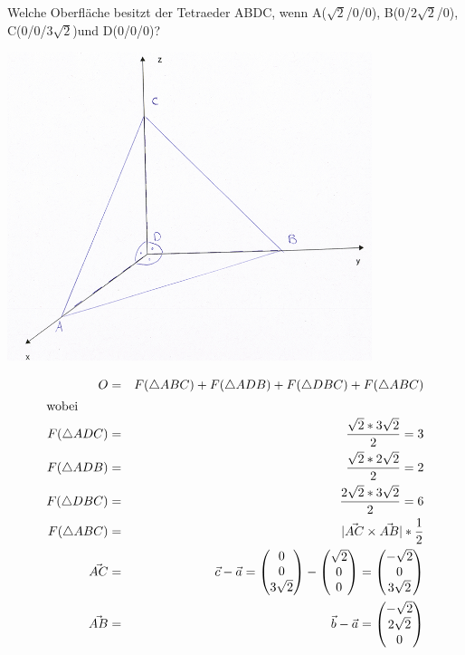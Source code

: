 \begin{myexample}
	Welche Oberfläche besitzt der Tetraeder ABDC, wenn A($\sqrt{2}$/0/0), B(0/$2\sqrt{2}$/0), C(0/0/$3\sqrt{2}$)und D(0/0/0)?
\begin{center}
	 \includegraphics[width=0.8\textwidth]{imgs/tetraeder.png}
 \end{center}
\begin{eqnarray*}
	O &=& F(\triangle ABC) + F(\triangle ADB) + F(\triangle DBC) + F(\triangle ABC)\\
\shortintertext{wobei}
	F(\triangle ADC) &=& \frac{\sqrt{2} * 3\sqrt{2}}{2} = 3\\
	F(\triangle ADB) &=& \frac{\sqrt{2} * 2\sqrt{2}}{2} = 2\\
	F(\triangle DBC) &=& \frac{2\sqrt{2} * 3\sqrt{2}}{2} = 6\\
	F(\triangle ABC) &=& |\vec{AC} \times \vec{AB} | * \frac{1}{2}\\
	\vec{AC} &=& \vec{c} - \vec{a} = \begin{pmatrix}0\\0\\3 \sqrt{2}\end{pmatrix} - \begin{pmatrix}\sqrt{2}\\0\\0\end{pmatrix} = \begin{pmatrix}-\sqrt{2}\\0\\3\sqrt{2}\end{pmatrix}\\
	\vec{AB} &=& \vec{b} - \vec{a} = \begin{pmatrix}-\sqrt{2}\\2\sqrt{2}\\0\end{pmatrix}

\end{eqnarray*}
\end{myexample}
